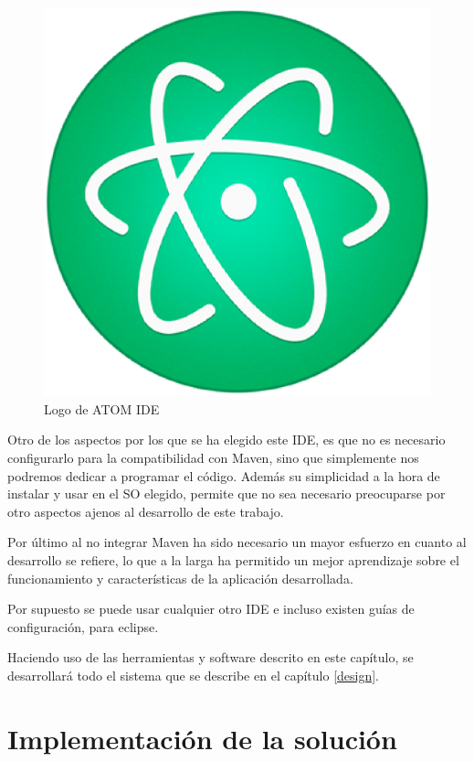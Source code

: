 \documentclass[a4paper,11pt]{book}
\begin{document}
\begin{figure}[tb]
\centering
\includegraphics[scale=0.2]{./figuras/atom}
\caption{Logo de ATOM \ac{IDE}}\label{logoAtom}
\end{figure}

Otro de los aspectos por los que se ha elegido este \ac{IDE}, es que no es necesario configurarlo para la compatibilidad con Maven, sino que simplemente nos podremos dedicar a programar el código. Además su simplicidad a la hora de instalar y usar en el \ac{SO} elegido, permite que no sea necesario preocuparse por otro aspectos ajenos al desarrollo de este trabajo.

Por último al no integrar Maven ha sido necesario un mayor esfuerzo en cuanto al desarrollo se refiere, lo que a la larga ha permitido un mejor aprendizaje sobre el funcionamiento y características de la aplicación desarrollada.

Por supuesto se puede usar cualquier otro \ac{IDE} e incluso existen guías de configuración, \cite{configuringEclipse} para eclipse.

Haciendo uso de las herramientas y software descrito en este capítulo, se desarrollará todo el sistema que se describe en el capítulo \ref{design}.



\chapter{Implementación de la solución}\label{implementing}
\end{document}
